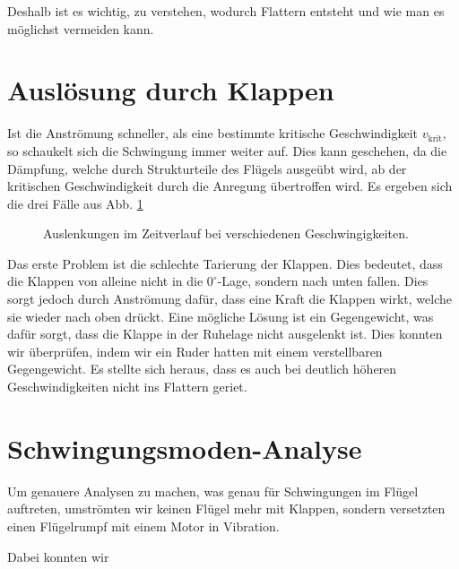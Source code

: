 \documentclass[12pt,a4paper,titlepage,headinclude,bibtotoc]{scrartcl}
\begin{document}
Deshalb ist es wichtig, zu verstehen, wodurch Flattern entsteht und wie man es möglichst vermeiden kann.


\section{Auslösung durch Klappen}
Ist die Anströmung schneller, als eine bestimmte kritische Geschwindigkeit $v_\text{krit}$, so schaukelt sich die Schwingung immer weiter auf.
Dies kann geschehen, da die Dämpfung, welche durch Strukturteile des Flügels ausgeübt wird, ab der kritischen Geschwindigkeit durch die Anregung übertroffen wird.
Es ergeben sich die drei Fälle aus Abb. \ref{fig:daempfung}

\begin{figure}[h]
  \centering
  \hfill
  \hfill
  \caption{Auslenkungen im Zeitverlauf bei verschiedenen Geschwingigkeiten.}
  \label{fig:daempfung}
\end{figure}

Das erste Problem ist die schlechte Tarierung der Klappen.
Dies bedeutet, dass die Klappen von alleine nicht in die $0^\circ$-Lage, sondern nach unten fallen.
Dies sorgt jedoch durch Anströmung dafür, dass eine Kraft die Klappen wirkt, welche sie wieder nach oben drückt.
Eine mögliche Lösung ist ein Gegengewicht, was dafür sorgt, dass die Klappe in der Ruhelage nicht ausgelenkt ist.
Dies konnten wir überprüfen, indem wir ein Ruder hatten mit einem verstellbaren Gegengewicht.
Es stellte sich heraus, dass es auch bei deutlich höheren Geschwindigkeiten nicht ins Flattern geriet.


\section{Schwingungsmoden-Analyse}
Um genauere Analysen zu machen, was genau für Schwingungen im Flügel auftreten, umströmten wir keinen Flügel mehr mit Klappen, sondern versetzten einen Flügelrumpf mit einem Motor in Vibration.

Dabei konnten wir 
\end{document}
